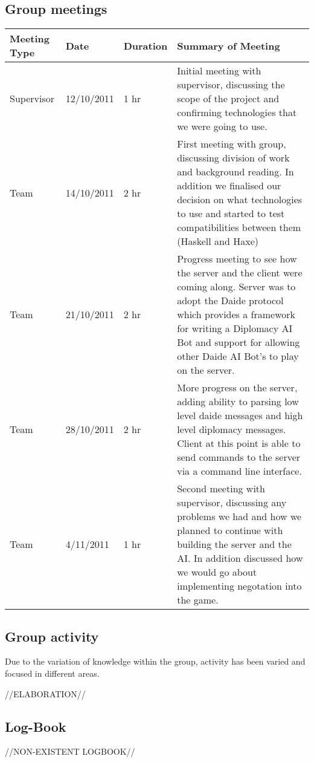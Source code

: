 \documentclass[12pt]{article}
\begin{document}
\subsection{Group meetings}
\begin{center}
    \begin{tabular}{ | l | l | l | p{8cm} |}
    \hline
    Meeting Type       & Date          & Duration   & Summary of Meeting \\ \hline

    Supervisor         & 12/10/2011    & 1 hr       & Initial meeting with supervisor, discussing the scope of the project and confirming technologies that we were going to use. \\ \hline
    Team               & 14/10/2011    & 2 hr       & First meeting with group, discussing division of work and background reading. In addition we finalised our decision on what technologies to use and started to test compatibilities between them (Haskell and Haxe) \\ \hline
    Team               & 21/10/2011    & 2 hr       & Progress meeting to see how the server and the client were coming along. Server was to adopt the Daide protocol which provides a framework for writing a Diplomacy AI Bot and support for allowing other Daide AI Bot's to play on the server.  \\ \hline
    Team               & 28/10/2011    & 2 hr       & More progress on the server, adding ability to parsing low level daide messages and high level diplomacy messages. Client at this point is able to send commands to the server via a command line interface.  \\ \hline
    Team               & 4/11/2011     & 1 hr       & Second meeting with supervisor, discussing any problems we had and how we planned to continue with building the server and the AI. In addition discussed how we would go about implementing negotation into the game.  \\ \hline

    \end{tabular}
\end{center}

\subsection{Group activity}
Due to the variation of knowledge within the group, activity has been varied and focused in different areas. 

//ELABORATION//

\subsection{Log-Book}
//NON-EXISTENT LOGBOOK//
\end{document}

